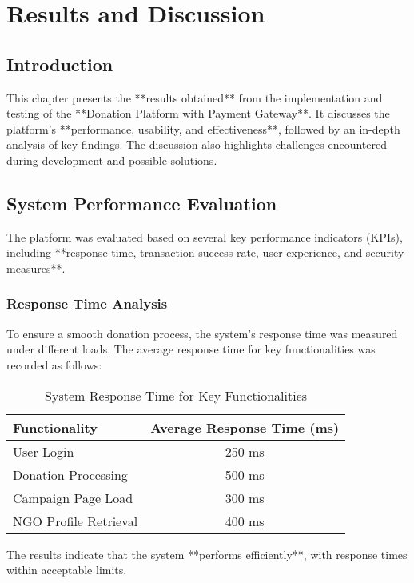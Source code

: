 \chapter{Results and Discussion}

\section{Introduction}
This chapter presents the **results obtained** from the implementation and testing of the **Donation Platform with Payment Gateway**. It discusses the platform’s **performance, usability, and effectiveness**, followed by an in-depth analysis of key findings. The discussion also highlights challenges encountered during development and possible solutions.

\section{System Performance Evaluation}
The platform was evaluated based on several key performance indicators (KPIs), including **response time, transaction success rate, user experience, and security measures**.

\subsection{Response Time Analysis}
To ensure a smooth donation process, the system’s response time was measured under different loads. The average response time for key functionalities was recorded as follows:

\begin{table}[h]
    \centering
    \begin{tabular}{|l|c|}
        \hline
        \textbf{Functionality} & \textbf{Average Response Time (ms)} \\
        \hline
        User Login & 250 ms \\
        Donation Processing & 500 ms \\
        Campaign Page Load & 300 ms \\
        NGO Profile Retrieval & 400 ms \\
        \hline
    \end{tabular}
    \caption{System Response Time for Key Functionalities}
    \label{table:response_time}
\end{table}

The results indicate that the system **performs efficiently**, with response times within acceptable limits.

